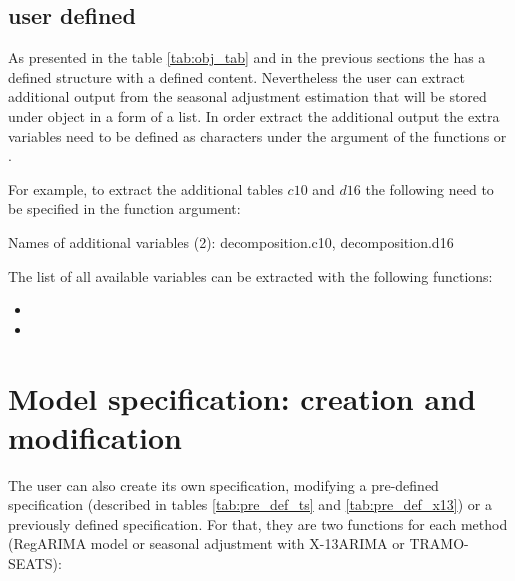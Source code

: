 \documentclass[article]{jss}
\begin{document}
\hypertarget{user-def}{%
\subsection{user defined}\label{user-def}}

As presented in the table \ref{tab:obj_tab} and in the previous sections
the  has a defined structure with a defined content.
Nevertheless the user can extract additional output from the seasonal
adjustment estimation that will be stored under 
object in a form of a list. In order extract the additional output the
extra variables need to be defined as characters under the argument
 of the functions  or .

For example, to extract the additional tables \(c10\) and \(d16\) the
following need to be specified in the function argument:

\begin{CodeChunk}


\begin{CodeOutput}
Names of additional variables (2):
decomposition.c10, decomposition.d16
\end{CodeOutput}
\end{CodeChunk}

The list of all available variables can be extracted with the following
functions:

\begin{itemize}
\item
\item
\end{itemize}

\hypertarget{user-def-spec}{%
\section{Model specification: creation and
modification}\label{user-def-spec}}

The user can also create its own specification, modifying a pre-defined
specification (described in tables \ref{tab:pre_def_ts} and
\ref{tab:pre_def_x13}) or a previously defined specification. For that,
they are two functions for each method (RegARIMA model or seasonal
adjustment with X-13ARIMA or TRAMO-SEATS):
\end{document}
